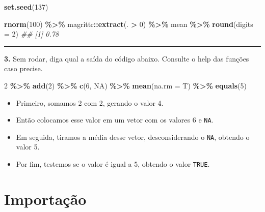 \documentclass[
]{book}
\newenvironment{Shaded}{\begin{snugshade}}{\end{snugshade}}
\newcommand{\CommentTok}[1]{\textcolor[rgb]{0.56,0.35,0.01}{\textit{#1}}}
\newcommand{\DataTypeTok}[1]{\textcolor[rgb]{0.13,0.29,0.53}{#1}}
\newcommand{\DecValTok}[1]{\textcolor[rgb]{0.00,0.00,0.81}{#1}}
\newcommand{\KeywordTok}[1]{\textcolor[rgb]{0.13,0.29,0.53}{\textbf{#1}}}
\newcommand{\NormalTok}[1]{#1}
\newcommand{\OperatorTok}[1]{\textcolor[rgb]{0.81,0.36,0.00}{\textbf{#1}}}
\newcommand{\OtherTok}[1]{\textcolor[rgb]{0.56,0.35,0.01}{#1}}
\newcommand{\StringTok}[1]{\textcolor[rgb]{0.31,0.60,0.02}{#1}}
\providecommand{\tightlist}{%
  \setlength{\itemsep}{0pt}\setlength{\parskip}{0pt}}
\begin{document}
\begin{Shaded}
\begin{Highlighting}[]
\KeywordTok{set.seed}\NormalTok{(}\DecValTok{137}\NormalTok{)}

\KeywordTok{rnorm}\NormalTok{(}\DecValTok{100}\NormalTok{) }\OperatorTok{\%>\%}
\StringTok{  }\NormalTok{magrittr}\OperatorTok{::}\KeywordTok{extract}\NormalTok{(. }\OperatorTok{>}\StringTok{ }\DecValTok{0}\NormalTok{) }\OperatorTok{\%>\%}
\StringTok{  }\NormalTok{mean }\OperatorTok{\%>\%}
\StringTok{  }\KeywordTok{round}\NormalTok{(}\DataTypeTok{digits =} \DecValTok{2}\NormalTok{)}
\CommentTok{\#\# [1] 0.78}
\end{Highlighting}
\end{Shaded}

\begin{center}\rule{0.5\linewidth}{0.5pt}\end{center}

\textbf{3.} Sem rodar, diga qual a saída do código abaixo. Consulte o help das funções caso precise.

\begin{Shaded}
\begin{Highlighting}[]
\DecValTok{2} \OperatorTok{\%>\%}
\StringTok{  }\KeywordTok{add}\NormalTok{(}\DecValTok{2}\NormalTok{) }\OperatorTok{\%>\%}
\StringTok{  }\KeywordTok{c}\NormalTok{(}\DecValTok{6}\NormalTok{, }\OtherTok{NA}\NormalTok{) }\OperatorTok{\%>\%}
\StringTok{  }\KeywordTok{mean}\NormalTok{(}\DataTypeTok{na.rm =}\NormalTok{ T) }\OperatorTok{\%>\%}
\StringTok{  }\KeywordTok{equals}\NormalTok{(}\DecValTok{5}\NormalTok{)}
\end{Highlighting}
\end{Shaded}

\begin{itemize}
\tightlist
\item
  Primeiro, somamos 2 com 2, gerando o valor 4.
\item
  Então colocamos esse valor em um vetor com os valores 6 e \texttt{NA}.
\item
  Em seguida, tiramos a média desse vetor, desconsiderando o \texttt{NA}, obtendo o valor 5.
\item
  Por fim, testemos se o valor é igual a 5, obtendo o valor \texttt{TRUE}.
\end{itemize}

\hypertarget{importauxe7uxe3o}{%
\chapter{Importação}\label{importauxe7uxe3o}}
\end{document}
